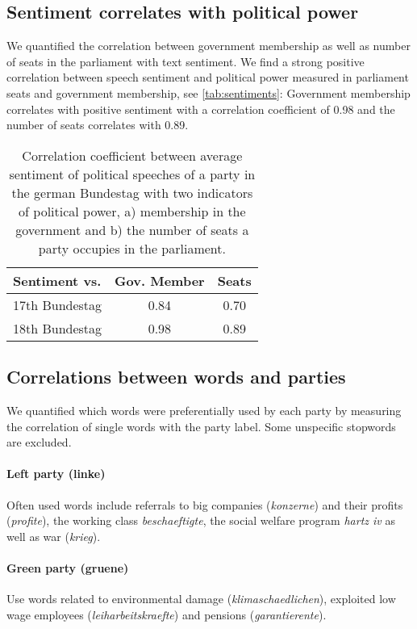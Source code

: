 \documentclass[11pt]{article}
\begin{document}
\subsection{Sentiment correlates with political power} 
We quantified the correlation between government membership as well as number of seats in the parliament with text sentiment. We find a strong positive correlation between speech sentiment and political power measured in parliament seats and government membership, see  \autoref{tab:sentiments}: Government membership correlates with positive sentiment with a correlation coefficient of 0.98 and the number of seats correlates with 0.89.

\begin{table}[t]
\caption{
\label{tab:sentiments}
Correlation coefficient between average sentiment of political speeches of a party in the german Bundestag with two indicators of political power, a) membership in the government and b) the number of seats a party occupies in the parliament.
}
\begin{center}
\begin{tabular}{lcc}
   Sentiment vs. &          Gov. Member    &  Seats\\
\hline\hline
17th Bundestag    &  0.84 & 0.70\\
18th Bundestag   &  0.98 & 0.89\\
%
\end{tabular}
\end{center}
\end{table}


%
\subsection{Correlations between words and parties}\label{sec:word_party_correlations}
We quantified which words were preferentially used by each party by measuring the correlation of single words with the party label. Some unspecific stopwords are excluded. 
\paragraph{\bf Left party (linke)} Often used words include referrals to big companies ({\em konzerne}) and their profits ({\em profite}), the working class {\em beschaeftigte}, the social welfare program {\em hartz iv} as well as war ({\em krieg}).
\paragraph{\bf Green party (gruene)} Use words related to environmental damage ({\em klimaschaedlichen}), exploited low wage employees ({\em leiharbeitskraefte}) and pensions ({\em garantierente}).
\end{document}
